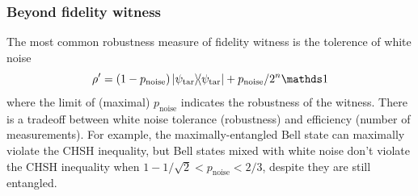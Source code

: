 \documentclass[
reprint,
aps,
pra,
floatfix,
]{revtex4-2}
\theoremstyle{plain}
\newtheorem{theorem}{Theorem}
\theoremstyle{definition}
\newtheorem{example}{Example}
\newcommand{\dm}{\rho}
\newcommand{\target}{\textup{tar}}
\newcommand{\noise}{\text{noise}}
\begin{document}
\subsubsection{Beyond fidelity witness}
The most common robustness measure of fidelity witness is the tolerence of white noise
\begin{equation}\label{eq:white_noise}
	\dm'
	= (1-p_{\noise}) \op{\psi_{\target}} + p_{\noise}/2^{n} \identity
\end{equation}
where the limit of (maximal) $p_{\noise}$ indicates the robustness of the witness.
There is a tradeoff between white noise tolerance (robustness) and efficiency (number of measurements).
For example, the maximally-entangled Bell state can maximally violate the CHSH inequality, 
but Bell states mixed with white noise don't violate the CHSH inequality when $ 1- 1/ \sqrt{2} < p_{\noise}<2/3 $, despite they are still entangled.
\end{document}
